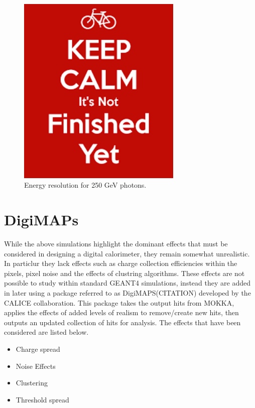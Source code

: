 \begin{figure}
  \centering
  \includegraphics[width=0.7\textwidth,keepaspectratio]{DECALStudies/fig/dummy}
  \caption{Energy resolution for 250 GeV photons.}
  \label{fig:resolution250}
\end{figure}

\section{DigiMAPs}

While the above simulations highlight the dominant effects that must be considered in designing a digital calorimeter, they remain somewhat unrealistic. In particlur they lack effects such as charge collection efficiencies within the pixels, pixel noise and the effects of clustring algorithms. These effects are not possible to study within standard GEANT4 simulations, instead they are added in later using a package referred to as DigiMAPS(CITATION) developed by the \ac{CALICE} collaboration. This package takes the output hits from MOKKA, applies the effects of added levels of realism to remove/create new hits, then outputs an updated collection of hits for analysis. The effects that have been considered are listed below.

\begin{itemize}
\item Charge spread
\item Noise Effects
\item Clustering
\item Threshold spread
\end{itemize}

